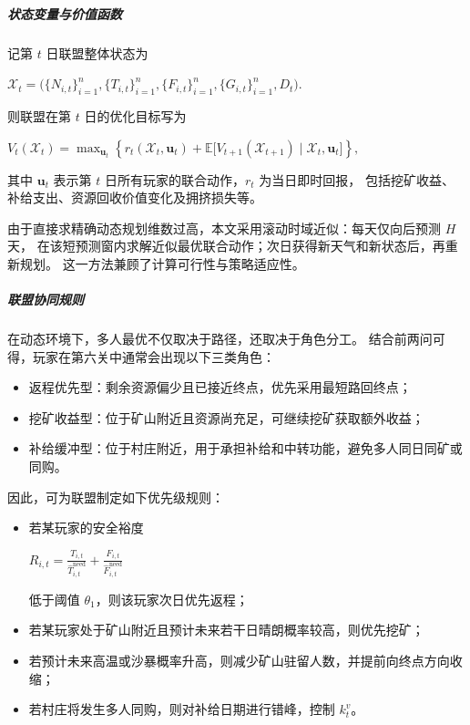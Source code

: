 \subparagraph{状态变量与价值函数}

记第 $t$ 日联盟整体状态为
\begin{center}
    $
    \mathcal X_t=
    \Big(\{N_{i,t}\}_{i=1}^n,\{T_{i,t}\}_{i=1}^n,\{F_{i,t}\}_{i=1}^n,\{G_{i,t}\}_{i=1}^n,D_t\Big).
    $
\end{center}

则联盟在第 $t$ 日的优化目标写为

\begin{center}
    $
    V_t(\mathcal X_t)=\max_{\mathbf u_t}\left\{r_t(\mathcal X_t,\mathbf u_t)+
    \mathbb E\big[V_{t+1}(\mathcal X_{t+1})\mid \mathcal X_t,\mathbf u_t\big]\right\},
    $
\end{center}

其中 $\mathbf u_t$ 表示第 $t$ 日所有玩家的联合动作，$r_t$ 为当日即时回报，
%
包括挖矿收益、补给支出、资源回收价值变化及拥挤损失等。

由于直接求精确动态规划维数过高，本文采用滚动时域近似：每天仅向后预测 $H$ 天，
%
在该短预测窗内求解近似最优联合动作；次日获得新天气和新状态后，再重新规划。
%
这一方法兼顾了计算可行性与策略适应性。

\subparagraph{联盟协同规则}

在动态环境下，多人最优不仅取决于路径，还取决于角色分工。
%
结合前两问可得，玩家在第六关中通常会出现以下三类角色：

\begin{itemize}
    \item 返程优先型：剩余资源偏少且已接近终点，优先采用最短路回终点；
    \item 挖矿收益型：位于矿山附近且资源尚充足，可继续挖矿获取额外收益；
    \item 补给缓冲型：位于村庄附近，用于承担补给和中转功能，避免多人同日同矿或同购。
\end{itemize}

因此，可为联盟制定如下优先级规则：

\begin{itemize}
    \item 若某玩家的安全裕度
          \begin{center}
                $R_{i,t}=\frac{T_{i,t}}{\widehat T_{i,t}^{\text{need}}}+
                \frac{F_{i,t}}{\widehat F_{i,t}^{\text{need}}}$
          \end{center}
          低于阈值 $\theta_1$，则该玩家次日优先返程；
    \item 若某玩家处于矿山附近且预计未来若干日晴朗概率较高，则优先挖矿；
    \item 若预计未来高温或沙暴概率升高，则减少矿山驻留人数，并提前向终点方向收缩；
    \item 若村庄将发生多人同购，则对补给日期进行错峰，控制 $k_t^v$。
\end{itemize}

